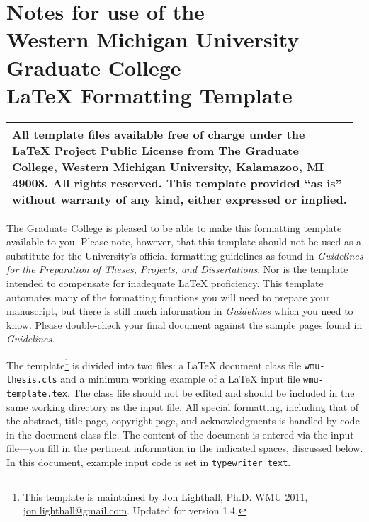 \documentclass{wmu-thesis}
\begin{document}
\singlespace
\chapter*{Notes for use of the \\Western Michigan University\\ Graduate College\\ \texorpdfstring{\LaTeX{}}{LaTeX} Formatting Template}
\begin{center}
\begin{tabular}{|p{0.97\linewidth}|}
\hline
All template files %
available free of charge under the \LaTeX{} Project Public License from The Graduate College, Western Michigan University, Kalamazoo, MI  49008.  All rights reserved.  %
 This template provided ``as is'' without warranty of any kind, either expressed or implied.\\
\hline
\end{tabular}
\end{center}

The Graduate College is pleased to be able to make this formatting template available to you.  Please note, however, that this template should not be used as a substitute for the University's official formatting guidelines as found in \textit{Guidelines for the Preparation of Theses, Projects, and Dissertations}.  Nor is the template intended to compensate for inadequate \LaTeX{} proficiency.  This template automates many of the formatting functions you will need to prepare your manuscript, but there is still much information in \textit{Guidelines} which you need to know.  Please double-check your final document against the sample pages found in \textit{Guidelines}.

\renewcommand{\thefootnote}{\fnsymbol{footnote}}

The template\footnote{This template is maintained by Jon Lighthall, Ph.D. WMU 2011, \href{mailto:jon.lighthall@gmail.com}{jon.lighthall@gmail.com}. Updated for version 1.4.}
is divided into two files: a \LaTeX{} document class file \texttt{wmu-thesis.cls} and a minimum working example of a \LaTeX{} input file \texttt{wmu-template.tex}.  The class file should not be edited and should be included in the same working directory as the input file.  All special formatting, including that of the abstract, title page, copyright page, and acknowledgments is handled by code in the document class file.  The content of the document is entered via the input file---you fill in the pertinent information in the indicated spaces, discussed below.  In this document, example input code is set in \texttt{typewriter text}.  
\end{document}

